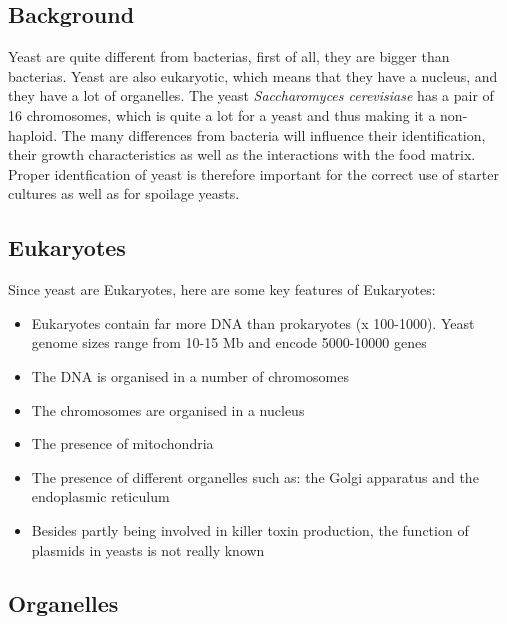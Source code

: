 \subsection{Background}
Yeast are quite different from bacterias, first of all, they are bigger than bacterias. Yeast are also eukaryotic, which means that they have a nucleus, and they have a lot of organelles. The yeast \textit{Saccharomyces cerevisiase} has a pair of 16 chromosomes, which is quite a lot for a yeast and thus making it a non-haploid.
The many differences from bacteria will influence their identification, their growth characteristics as well as the interactions with the food matrix. Proper identfication of yeast is therefore important for the correct use of starter cultures as well as for spoilage yeasts.

\subsection{Eukaryotes}

Since yeast are Eukaryotes, here are some key features of Eukaryotes:
\begin{highlight}
    \begin{itemize}
        \item Eukaryotes contain far more DNA than prokaryotes (x 100-1000). Yeast genome sizes
        range from 10-15 Mb and encode 5000-10000 genes
        \item The DNA is organised in a number of chromosomes
        \item The chromosomes are organised in a nucleus
        \item The presence of mitochondria
        \item The presence of different organelles such as: the Golgi apparatus and the endoplasmic
        reticulum
        \item Besides partly being involved in killer toxin production, the function of plasmids in
        yeasts is not really known
    \end{itemize}
\end{highlight}

\subsection{Organelles}


